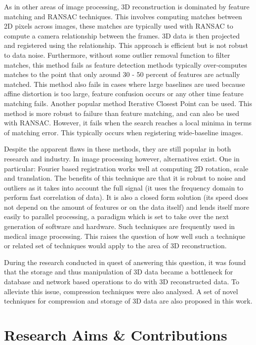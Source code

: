 As in other areas of image processing, 3D reconstruction is dominated by feature matching and RANSAC techniques. This involves computing matches between 2D pixels across images, these matches are typically used with RANSAC to compute a camera relationship between the frames. 3D data is then projected and registered using the relationship. This approach is efficient but is not robust to data noise. Furthermore, without some outlier removal function to filter matches, this method fails as feature detection methods typically over-computes matches to the point that only around 30 - 50 percent of features are actually matched. This method also fails in cases where large baselines are used because affine distortion is too large, feature confusion occurs or any other time feature matching fails. Another popular method Iterative Closest Point can be used. This method is more robust to failure than feature matching, and can also be used with RANSAC. However, it fails when the search reaches a local minima in terms of matching error. This typically occurs when registering wide-baseline images.

Despite the apparent flaws in these methods, they are still popular in both research and industry. In image processing however, alternatives exist. One in particular: Fourier based registration works well at computing 2D rotation, scale and translation. The benefits of this technique are that it is robust to noise and outliers as it takes into account the full signal (it uses the frequency domain to perform fast correlation of data). It is also a closed form solution (its speed does not depend on the amount of features or on the data itself) and lends itself more easily to parallel processing, a paradigm which is set to take over the next generation of software and hardware. Such techniques are frequently used in medical image processing. This raises the question of how well such a technique or related set of techniques would apply to the area of 3D reconstruction.

During the research conducted in quest of answering this question, it was found that the storage and thus manipulation of 3D data became a bottleneck for database and network based operations to do with 3D reconstructed data. To alleviate this issue, compression techniques were also analysed. A set of novel techniques for compression and storage of 3D data are also proposed in this work.  

\section{Research Aims \& Contributions}

